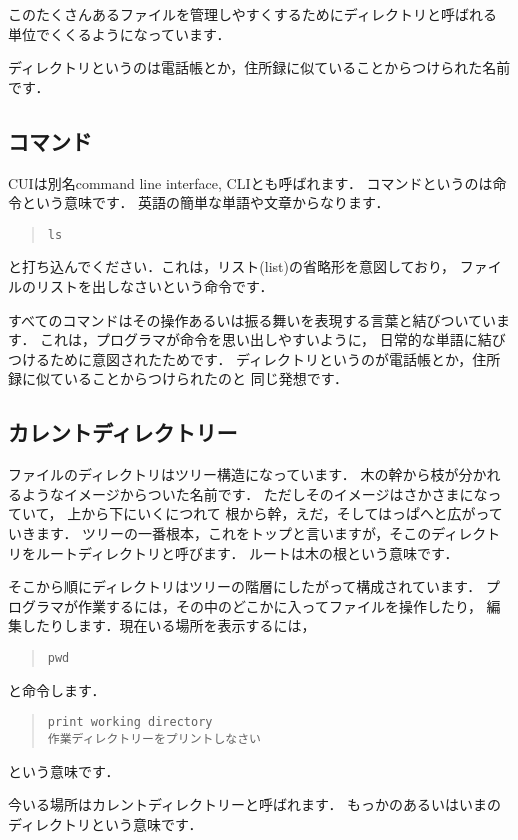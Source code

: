 \documentclass[12pt,a4paper]{jsarticle}
\begin{document}
このたくさんあるファイルを管理しやすくするためにディレクトリと呼ばれる
単位でくくるようになっています．

ディレクトリというのは電話帳とか，住所録に似ていることからつけられた名前です．

\subsection{コマンド}
CUIは別名command line interface, CLIとも呼ばれます．
コマンドというのは命令という意味です．
英語の簡単な単語や文章からなります．
\begin{quote}\begin{verbatim}
ls
\end{verbatim}\end{quote}
と打ち込んでください．これは，リスト(list)の省略形を意図しており，
ファイルのリストを出しなさいという命令です．

すべてのコマンドはその操作あるいは振る舞いを表現する言葉と結びついています．
これは，プログラマが命令を思い出しやすいように，
日常的な単語に結びつけるために意図されたためです．
ディレクトリというのが電話帳とか，住所録に似ていることからつけられたのと
同じ発想です．

\subsection{カレントディレクトリー}
ファイルのディレクトリはツリー構造になっています．
木の幹から枝が分かれるようなイメージからついた名前です．
ただしそのイメージはさかさまになっていて，
上から下にいくにつれて
根から幹，えだ，そしてはっぱへと広がっていきます．
ツリーの一番根本，これをトップと言いますが，そこのディレクトリをルートディレクトリと呼びます．
ルートは木の根という意味です．

そこから順にディレクトリはツリーの階層にしたがって構成されています．
プログラマが作業するには，その中のどこかに入ってファイルを操作したり，
編集したりします．現在いる場所を表示するには，
\begin{quote}\begin{verbatim}
pwd
\end{verbatim}\end{quote}
と命令します．
\begin{quote}\begin{verbatim}
print working directory
作業ディレクトリーをプリントしなさい
\end{verbatim}\end{quote}
という意味です．

今いる場所はカレントディレクトリーと呼ばれます．
もっかのあるいはいまのディレクトリという意味です．
\end{document}

